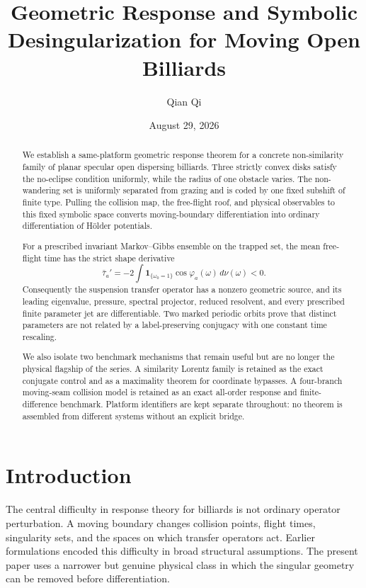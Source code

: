\documentclass[11pt,reqno]{amsart}
\title[Geometric response for moving open billiards]{Geometric Response and Symbolic Desingularization for Moving Open Billiards}
\author{Qian Qi}
\date{August 29, 2026}
\theoremstyle{definition}
\theoremstyle{remark}
\begin{document}
\begin{abstract}
We establish a same-platform geometric response theorem for a concrete
non-similarity family of planar specular open dispersing billiards.  Three
strictly convex disks satisfy the no-eclipse condition uniformly, while the
radius of one obstacle varies.  The non-wandering set is uniformly separated
from grazing and is coded by one fixed subshift of finite type.  Pulling the
collision map, the free-flight roof, and physical observables to this fixed
symbolic space converts moving-boundary differentiation into ordinary
differentiation of Hölder potentials.

For a prescribed invariant Markov--Gibbs ensemble on the trapped set, the mean
free-flight time has the strict shape derivative
\[
 \bar\tau_a'
 =-2\int \mathbf 1_{\{\omega_0=1\}}\cos\varphi_a(\omega)\,d\nu(\omega)<0.
\]
Consequently the suspension transfer operator has a nonzero geometric source,
and its leading eigenvalue, pressure, spectral projector, reduced resolvent,
and every prescribed finite parameter jet are differentiable.  Two marked
periodic orbits prove that distinct parameters are not related by a
label-preserving conjugacy with one constant time rescaling.

We also isolate two benchmark mechanisms that remain useful but are no longer
the physical flagship of the series.  A similarity Lorentz family is retained
as the exact conjugate control and as a maximality theorem for coordinate
bypasses.  A four-branch moving-seam collision model is retained as an exact
all-order response and finite-difference benchmark.  Platform identifiers are
kept separate throughout: no theorem is assembled from different systems
without an explicit bridge.
\end{abstract}

\maketitle
\tableofcontents

\section{Introduction}

The central difficulty in response theory for billiards is not ordinary
operator perturbation.  A moving boundary changes collision points, flight
times, singularity sets, and the spaces on which transfer operators act.
Earlier formulations encoded this difficulty in broad structural assumptions.
The present paper uses a narrower but genuine physical class in which the
singular geometry can be removed before differentiation.
\end{document}
